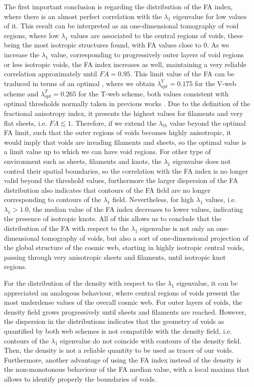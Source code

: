 \documentclass[a4,useAMS,usenatbib,usegraphicx]{latex/mn2e}
\begin{document}
The first important conclusion is regarding the distribution of the FA 
index, where there is an almost perfect correlation with the $\lambda_1$ 
eigenvalue for low values of it. This result can be interpreted as an 
one-dimensional tomography of void regions, where low $\lambda_1$ values 
are associated to the central regions of voids, these being the most 
isotropic structures found, with FA values close to 0. As we increase the 
$\lambda_1$ value, corresponding to progressively outer layers of void 
regions or less isotropic voids, the FA index increases as well, 
maintaining a very reliable correlation approximately until $FA=0.95$. 
This limit value of the FA can be traduced in terms of an optimal \lth, 
where we obtain $\lambda_{opt}^V = 0.175$ for the V-web scheme and 
$\lambda_{opt}^T = 0.265$ for the T-web scheme, both values consistent 
with optimal thresholds normally taken in previous works \SRKED{[references]}. 
Due to the definition of the fractional anisotropy index, it presents the 
highest values for filaments and very flat sheets, i.e. $FA\lesssim 1$.
Therefore, if we extend the $\lambda_{th}$ value beyond the optimal 
FA limit, such that the outer regions of voids becomes highly anisotropic, 
it would imply that voids are invading filaments and sheets, so the 
optimal \lth value is a limit value up to which we can have void regions. 
For other type of environment such as sheets, filaments and knots, the 
$\lambda_1$ eigenvalue does not control their spatial boundaries, so the 
correlation with the FA index is no longer valid beyond the threshold 
values, furthermore the larger dispersion of the FA distribution also 
indicates that contours of the FA field are no longer corresponding to 
contours of the $\lambda_1$ field. Nevertheless, for high $\lambda_1$ 
values, i.e. $\lambda_1>1.0$, the median value of the FA index decreases 
to lower values, indicating the presence of isotropic knots. All of this 
allows us to conclude that the distribution of the FA with respect to the 
$\lambda_1$ eigenvalue is not only an one-dimensional tomography of voids, 
but also a sort of one-dimensional projection of the global structure of 
the cosmic web, starting in highly isotropic central voids, passing 
through very anisotropic sheets and filaments, until isotropic knot 
regions.


For the distribution of the density with respect to the $\lambda_1$ 
eigenvalue, it can be appreciated an analogous behaviour, where central 
regions of voids present the most underdense values of the overall cosmic 
web. For outer layers of voids, the density field grows progressively 
until sheets and filaments are reached. However, the dispersion in the 
distributions indicates that the geometry of voids as quantified by both 
web schemes is not compatible with the density field, i.e. contours of the
$\lambda_1$ eigenvalue do not coincide with contours of the density field. 
Then, the density is not a reliable quantity to be used as tracer of our 
voids. Furthermore, another advantage of using the FA index instead of the
density is the non-monotonous behaviour of the FA median value, with a 
local maxima that allows to identify properly the boundaries of voids.
\end{document}
